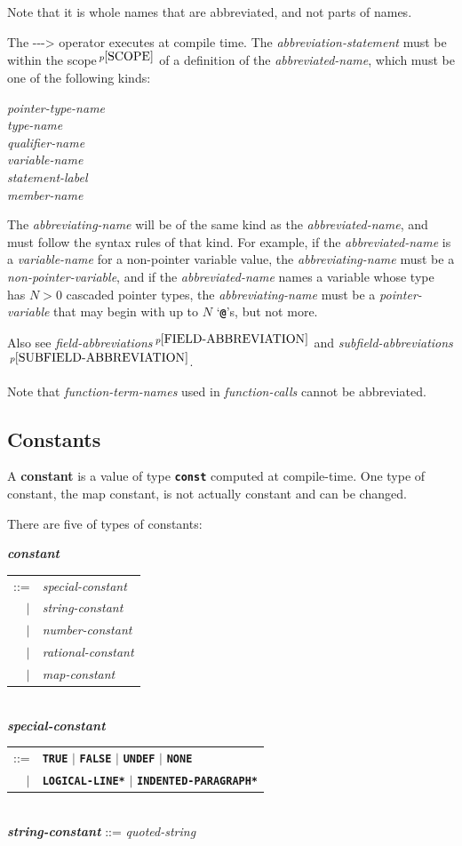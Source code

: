 \documentclass[12pt]{article}
\newcommand{\TT}[1]{{\tt \bfseries #1}}
\newcommand{\ABV}{-{}-{}->}
\newcommand{\key}[1]{{\rm \bfseries #1}}
\newcommand{\ttkey}[1]{{\tt \bfseries #1}}
\newcommand{\emkey}[1]{{\em \bfseries #1}}
\newcommand{\pagnote}[1]{$\,^{p\pageref{#1}}$}
\newenvironment{indpar}[1][0.3in]%
	{\begin{list}{}%
		     {\setlength{\itemsep}{0in}%
		      \setlength{\topsep}{0in}%
		      \setlength{\parsep}{1ex}%
		      \setlength{\labelwidth}{#1}%
		      \setlength{\leftmargin}{#1}%
		      \addtolength{\leftmargin}{\labelsep}}%
	 \item}%
	{\end{list}}
\begin{document}
Note that it is whole names that are abbreviated, and not parts of
names.

The \ABV{} operator executes at compile time.  The {\em abbreviation-statement}
must be within the scope\pagnote{SCOPE}
of a definition of the {\em abbreviated-name},
which must be one of the following kinds:
\begin{center} \em
pointer-type-name \\
type-name \\
qualifier-name \\
variable-name \\
statement-label \\
member-name
\end{center}
The {\em abbreviating-name} will be of the same kind as the
{\em abbreviated-name}, and must follow the syntax rules of that
kind.  For example, if the {\em abbreviated-name}
is a {\em variable-name} for a non-pointer variable value,
the {\em abbreviating-name} must be a {\em non-pointer-variable},
and if the {\em abbreviated-name} names a variable whose type has
$N>0$ cascaded pointer types,
the {\em abbreviating-name} must be a {\em pointer-variable}
that may begin with up to $N$ `\TT{@}'s, but not more.

Also see {\em field-abbreviations}\pagnote{FIELD-ABBREVIATION}
and {\em subfield-abbreviations}\pagnote{SUBFIELD-ABBREVIATION}.

Note that {\em function-term-names} used in {\em function-calls}
cannot be abbreviated.


\subsection{Constants}
\label{CONSTANTS}

A \key{constant} is a value of type \ttkey{const} computed at
compile-time.  One type of constant, the map constant, is not
actually constant and can be changed.

There are five of types of constants:

\begin{indpar}
\emkey{constant}\label{CONSTANT}
    \begin{tabular}[t]{rl}
    ::= & {\em special-constant} \\
    $|$ & {\em string-constant} \\
    $|$ & {\em number-constant} \\
    $|$ & {\em rational-constant} \\
    $|$ & {\em map-constant} \\
    \end{tabular} \\
\emkey{special-constant}
    \begin{tabular}[t]{@{}rl}
    ::= & \ttkey{TRUE} $|$ \ttkey{FALSE}
                       $|$ \ttkey{UNDEF} $|$ \ttkey{NONE} \\
    $|$ & \ttkey{*LOGICAL-LINE*} $|$ \ttkey{*INDENTED-PARAGRAPH*} \\
    \end{tabular} \\
\emkey{string-constant}\label{STRING-CONSTANT} ::= {\em quoted-string}
\end{indpar}
\end{document}
